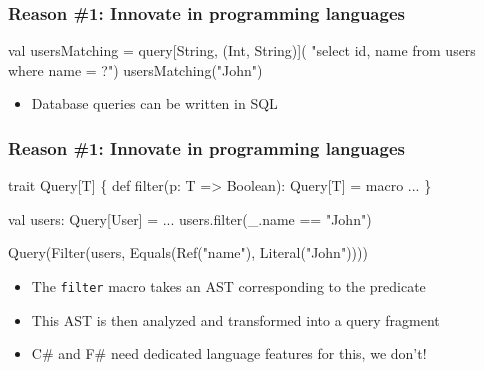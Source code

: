 \documentclass[svgnames,dvipsnames,hyperref={bookmarks=false},usepdftitle=false]{beamer}
\begin{document}

\begin{frame}[fragile, t]
\frametitle{Reason \#1: Innovate in programming languages}

\begin{semiverbatim}
val usersMatching = query[String, (Int, String)](
  "select id, name from users where name = ?")
usersMatching("John")



\end{semiverbatim}

\begin{itemize}
\item Database queries can be written in SQL
\end{itemize}
\end{frame}

\begin{frame}[fragile]
\frametitle{Reason \#1: Innovate in programming languages}

\begin{semiverbatim}
trait Query[T] \{
  \alert{def filter(p: T => Boolean): Query[T] = macro ...}
\}

val users: Query[User] = ...
users\alert{.filter(}_.name == "John"\alert{)}


                          \arrowdown

Query(Filter(users, Equals(Ref("name"), Literal("John"))))

\end{semiverbatim}

\begin{itemize}
\item The \texttt{filter} macro takes an AST corresponding to the predicate
\item This AST is then analyzed and transformed into a query fragment
\item \alert{C\# and F\# need dedicated language features for this, we don't!}
\end{itemize}
\end{frame}
\end{document}
